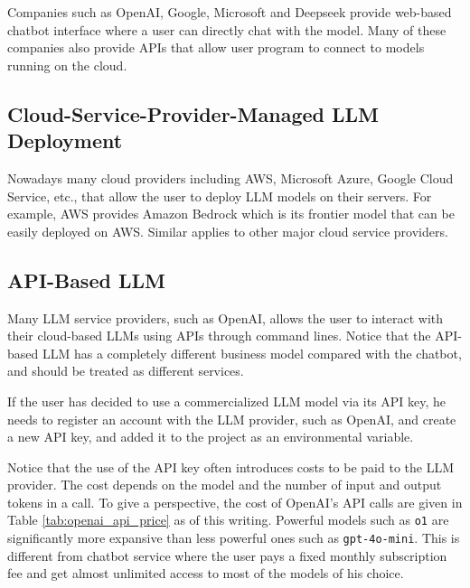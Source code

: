 Companies such as OpenAI, Google, Microsoft and Deepseek provide web-based chatbot interface where a user can directly chat with the model. Many of these companies also provide APIs that allow user program to connect to models running on the cloud.

\subsection{Cloud-Service-Provider-Managed LLM Deployment}

Nowadays many cloud providers including AWS, Microsoft Azure, Google Cloud Service, etc., that allow the user to deploy LLM models on their servers. For example, AWS provides Amazon Bedrock which is its frontier model that can be easily deployed on AWS. Similar applies to other major cloud service providers.

\subsection{API-Based LLM}

Many LLM service providers, such as OpenAI, allows the user to interact with their cloud-based LLMs using APIs through command lines. Notice that the API-based LLM has a completely different business model compared with the chatbot, and should be treated as different services.

If the user has decided to use a commercialized LLM model via its API key, he needs to register an account with the LLM provider, such as OpenAI, and create a new API key, and added it to the project as an environmental variable. 

Notice that the use of the API key often introduces costs to be paid to the LLM provider. The cost depends on the model and the number of input and output tokens in a call. To give a perspective, the cost of OpenAI's API calls are given in Table \ref{tab:openai_api_price} as of this writing. Powerful models such as \texttt{o1} are significantly more expansive than less powerful ones such as \texttt{gpt-4o-mini}. This is different from chatbot service where the user pays a fixed monthly subscription fee and get almost unlimited access to most of the models of his choice.

